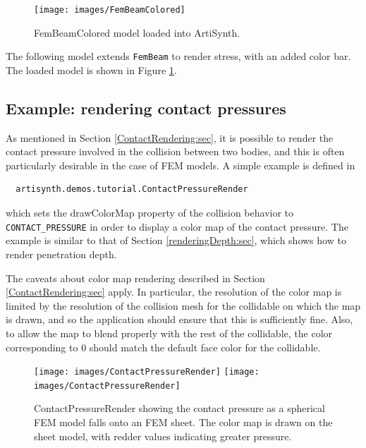 \begin{figure}[ht]
	\centering
	\texttt{[image: images/FemBeamColored]}
	\caption{FemBeamColored model loaded into ArtiSynth.}
	\label{fig:fem:beamcolored}
\end{figure}

The following model extends {\tt FemBeam} to render stress, with an added 
color bar.  The loaded model is shown in Figure \ref{fig:fem:beamcolored}.
\lstset{numbers=left}

\lstset{numbers=none}

\subsection{Example: rendering contact pressures}
\label{renderingContactPressure:sec}

As mentioned in Section \ref{ContactRendering:sec}, it is possible to
render the contact pressure involved in the collision between two
bodies, and this is often particularly desirable in the case of FEM
models. A simple example is defined in
%
\begin{verbatim}
  artisynth.demos.tutorial.ContactPressureRender
\end{verbatim}
%
which sets the {\sf drawColorMap} property of the collision behavior to {\tt
CONTACT\_PRESSURE} in order to display a color map of the contact
pressure. The example is similar to that
of Section \ref{renderingDepth:sec}, which shows how to render
penetration depth.

\begin{sideblock}
The caveats about color map rendering described in Section
\ref{ContactRendering:sec} apply. In particular, the resolution of the
color map is limited by the resolution of the collision mesh for the
collidable on which the map is drawn, and so the application should
ensure that this is sufficiently fine. Also, to allow the map to blend
properly with the rest of the collidable, the color corresponding to
$0$ should match the default face color for the collidable.
\end{sideblock}

\begin{figure}[ht]
\begin{center}
\iflatexml
 \texttt{[image: images/ContactPressureRender]}
\else
 \texttt{[image: images/ContactPressureRender]}
\fi
\end{center}
\caption{ContactPressureRender showing the contact pressure as a
spherical FEM model falls onto an FEM sheet.  The color map is drawn
on the sheet model, with redder values indicating greater pressure.}
\label{ContactPressureRender:fig}
\end{figure}

